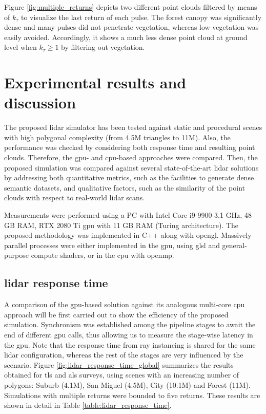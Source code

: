 Figure \ref{fig:multiple_returns} depicts two different point clouds filtered by means of $k_{\tau}$ to visualize the last return of each pulse. The forest canopy was significantly dense and many pulses did not penetrate vegetation, whereas low vegetation was easily avoided. Accordingly, it shows a much less dense point cloud at ground level when $k_{\tau} \geq 1$ by filtering out vegetation.

\section{Experimental results and discussion}

The proposed \acrshort{lidar} simulator has been tested against static and procedural scenes with high polygonal complexity (from 4.5M triangles to 11M). Also, the performance was checked by considering both response time and resulting point clouds. Therefore, the \acrshort{gpu}- and \acrshort{cpu}-based approaches were compared. Then, the proposed simulation was compared against several state-of-the-art \acrshort{lidar} solutions by addressing both quantitative metrics, such as the facilities to generate dense semantic datasets, and qualitative factors, such as the similarity of the point clouds with respect to real-world \acrshort{lidar} scans. 

Measurements were performed using a PC with Intel Core i9-9900 3.1 GHz, 48 GB RAM, RTX 2080 Ti \acrshort{gpu} with 11 GB RAM (Turing architecture). The proposed methodology was implemented in C++ along with \acrshort{opengl}. Massively parallel processes were either implemented in the \acrshort{gpu}, using \acrshort{glsl} and general-purpose compute shaders, or in the \acrshort{cpu} with \acrshort{openmp}. 

\subsection{\acrshort{lidar} response time}

A comparison of the \acrshort{gpu}-based solution against its analogous multi-core \acrshort{cpu} approach will be first carried out to show the efficiency of the proposed simulation. Synchronism was established among the pipeline stages to await the end of different \acrshort{gpu} calls, thus allowing us to measure the stage-wise latency in the \acrshort{gpu}. Note that the response time from ray instancing is shared for the same \acrshort{lidar} configuration, whereas the rest of the stages are very influenced by the scenario. Figure \ref{fig:lidar_response_time_global} summarizes the results obtained for \acrshort{tls} and \acrshort{als} surveys, using scenes with an increasing number of polygons: Suburb (4.1M), San Miguel (4.5M), City (10.1M) and Forest (11M). Simulations with multiple returns were bounded to five returns. These results are shown in detail in Table \ref{table:lidar_response_time}.

